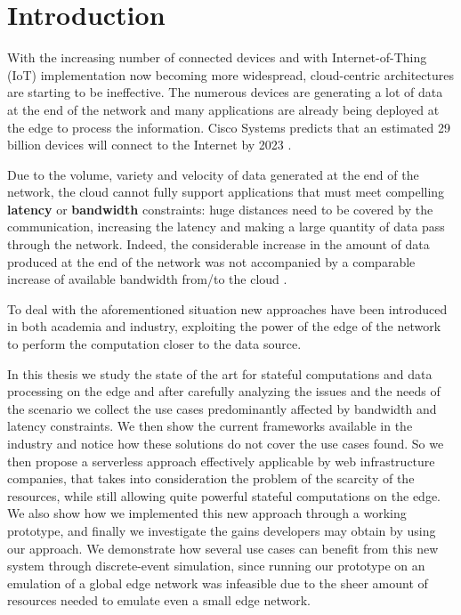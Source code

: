 \section{Introduction}
\label{sec:introduction}

With the increasing number of connected devices and with Internet-of-Thing (IoT) implementation now becoming more widespread, cloud-centric architectures are starting to be ineffective. The numerous devices are generating a lot of data at the end of the network and many applications are already being deployed at the edge to process the information.
Cisco Systems predicts that an estimated 29 billion devices will connect to the Internet by 2023 \cite{cisco2018-2023}.

Due to the volume, variety and velocity of data generated at the end of the network, the cloud cannot fully support applications that must meet compelling \textbf{latency} or \textbf{bandwidth} constraints: huge distances need to be covered by the communication, increasing the latency and making a large quantity of data pass through the network.
Indeed, the considerable increase in the amount of data produced at the end of the network was not accompanied by a comparable increase of available bandwidth from/to the cloud \cite{promise-of-edge-computing}.

To deal with the aforementioned situation new approaches have been introduced in both academia and industry, exploiting the power of the edge of the network to perform the computation closer to the data source.

In this thesis we study the state of the art for stateful computations and data processing on the edge and after carefully analyzing the issues and the needs of the scenario we collect the use cases predominantly affected by bandwidth and latency constraints. We then show the current frameworks available in the industry and notice how these solutions do not cover the use cases found. So we then propose a serverless approach effectively applicable by web infrastructure companies, that takes into consideration the problem of the scarcity of the resources, while still allowing quite powerful stateful computations on the edge. We also show how we implemented this new approach through a working prototype, and finally we investigate the gains developers may obtain by using our approach. We demonstrate how several use cases can benefit from this new system through discrete-event simulation, since running our prototype on an emulation of a global edge network was infeasible due to the sheer amount of resources needed to emulate even a small edge network.




